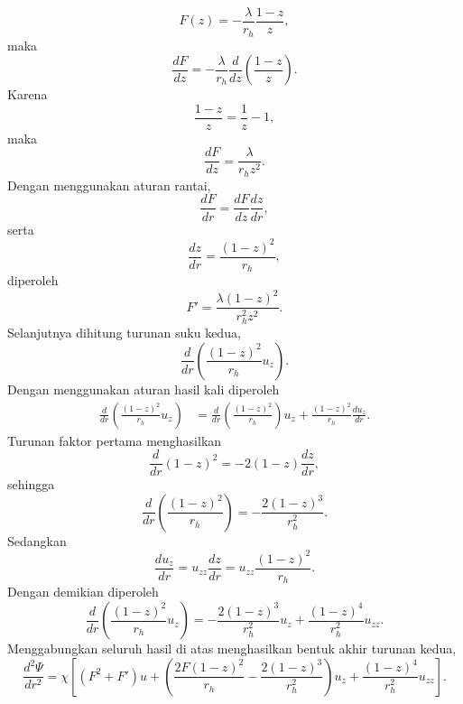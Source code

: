 \begin{equation} F(z) = -\frac{\lambda}{r_h} \frac{1-z}{z}, \end{equation}
maka
\begin{equation} \frac{dF}{dz} = -\frac{\lambda}{r_h} \frac{d}{dz} \left( \frac{1-z}{z} \right). \end{equation}
Karena
\begin{equation} \frac{1-z}{z} = \frac{1}{z}-1, \end{equation}
maka
\begin{equation} \frac{dF}{dz} = \frac{\lambda}{r_hz^2}. \end{equation}
Dengan menggunakan aturan rantai,
\begin{equation} \frac{dF}{dr} = \frac{dF}{dz} \frac{dz}{dr}, \end{equation}
serta
\begin{equation} \frac{dz}{dr} = \frac{(1-z)^2}{r_h}, \end{equation}
diperoleh
\begin{equation} \boxed{ F' = \frac{\lambda(1-z)^2} {r_h^2z^2}. } \end{equation}
Selanjutnya dihitung turunan suku kedua,
\begin{equation} \frac{d}{dr} \left( \frac{(1-z)^2}{r_h}u_z \right). \end{equation}
Dengan menggunakan aturan hasil kali diperoleh
\begin{align} \frac{d}{dr} \left( \frac{(1-z)^2}{r_h}u_z \right) &= \frac{d}{dr} \left( \frac{(1-z)^2}{r_h} \right) u_z + \frac{(1-z)^2}{r_h} \frac{du_z}{dr}. \end{align}
Turunan faktor pertama menghasilkan
\begin{equation} \frac{d}{dr} (1-z)^2 = -2(1-z) \frac{dz}{dr}, \end{equation}
sehingga
\begin{equation} \frac{d}{dr} \left( \frac{(1-z)^2}{r_h} \right) = -\frac{2(1-z)^3}{r_h^2}. \end{equation}
Sedangkan
\begin{equation} \frac{du_z}{dr} = u_{zz} \frac{dz}{dr} = u_{zz} \frac{(1-z)^2}{r_h}. \end{equation}
Dengan demikian diperoleh
\begin{equation} \boxed{ \frac{d}{dr} \left( \frac{(1-z)^2}{r_h}u_z \right) = -\frac{2(1-z)^3}{r_h^2}u_z + \frac{(1-z)^4}{r_h^2}u_{zz}. } \end{equation}
Menggabungkan seluruh hasil di atas menghasilkan bentuk akhir turunan kedua,
\begin{equation} \boxed{ \frac{d^2\Psi}{dr^2} = \chi \left[ (F^2+F')u + \left( \frac{2F(1-z)^2}{r_h} - \frac{2(1-z)^3}{r_h^2} \right)u_z + \frac{(1-z)^4}{r_h^2}u_{zz} \right]. } \end{equation}
